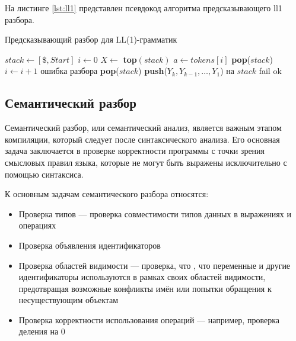\documentclass[14pt, russian]{scrartcl}
\begin{document}
На листинге \ref{lst:ll1} представлен псевдокод алгоритма предсказывающего ll1 разбора.

\begin{listing}
	\caption{Предсказывающий разбор для LL(1)-грамматик}
	\label{lst:ll1}
\begin{algorithm}[H]
	\begin{algorithmic}[1]
	  \State $stack \gets [\$, Start]$ 
	  \State $i \gets 0$
		\State $X \gets$ \textbf{top}$(stack)$
		\State $a \gets tokens[i]$
			 \State \textbf{pop}($stack$)
			 \State $i \gets i + 1$
		  \Else
			 \State \Return ошибка разбора
		  \EndIf
		\Else
			 \State \textbf{pop}($stack$)
			 \State \textbf{push}($Y_k, Y_{k-1}, \dots, Y_1$) на $stack$
		  \Else
			 \State \Return fail
		  \EndIf
		\EndIf
	  \EndWhile
	  \State \Return ok
	\EndProcedure
	\end{algorithmic}
\end{algorithm}
\end{listing}

\subsection{Семантический разбор}

Семантический разбор\cite{wilhelm2013compiler}, или семантический анализ, является важным этапом компиляции, который следует
после синтаксического анализа. Его основная задача заключается в проверке корректности программы с
точки зрения смысловых правил языка, которые не могут быть выражены исключительно с помощью синтаксиса.

К основным задачам семантического разбора относятся:

\begin{itemize}
	\item Проверка типов --- проверка совместимости типов данных в выражениях и операциях
	\item Проверка объявления идентификаторов
	\item Проверка областей видимости --- проверка, что , что переменные и другие идентификаторы используются в
	рамках своих областей видимости, предотвращая возможные конфликты имён или попытки обращения к
	несуществующим объектам
	\item Проверка корректности использования операций --- например, проверка деления на 0
\end{itemize}
\end{document}
